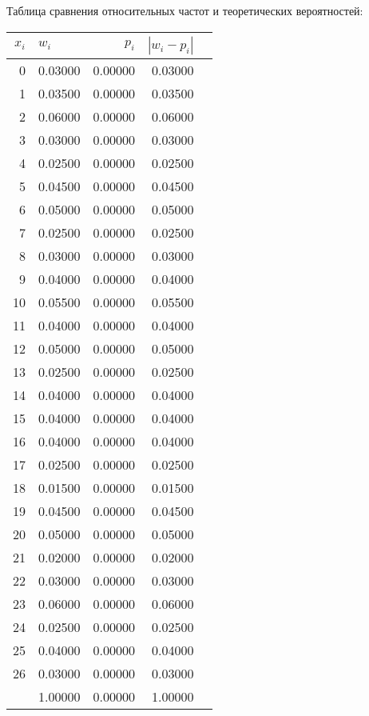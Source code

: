 
\newline

\newline
Таблица сравнения относительных частот и теоретических вероятностей:\newline
\begin{center}
\begin{tabular}{| r | l | r | r | r |}
\hline
$x_i$ & $w_i$ & $p_i$ & $|w_i-p_i|$ \\\hline
0 & 0.03000 & 0.00000 & 0.03000 \\\hline
1 & 0.03500 & 0.00000 & 0.03500 \\\hline
2 & 0.06000 & 0.00000 & 0.06000 \\\hline
3 & 0.03000 & 0.00000 & 0.03000 \\\hline
4 & 0.02500 & 0.00000 & 0.02500 \\\hline
5 & 0.04500 & 0.00000 & 0.04500 \\\hline
6 & 0.05000 & 0.00000 & 0.05000 \\\hline
7 & 0.02500 & 0.00000 & 0.02500 \\\hline
8 & 0.03000 & 0.00000 & 0.03000 \\\hline
9 & 0.04000 & 0.00000 & 0.04000 \\\hline
10 & 0.05500 & 0.00000 & 0.05500 \\\hline
11 & 0.04000 & 0.00000 & 0.04000 \\\hline
12 & 0.05000 & 0.00000 & 0.05000 \\\hline
13 & 0.02500 & 0.00000 & 0.02500 \\\hline
14 & 0.04000 & 0.00000 & 0.04000 \\\hline
15 & 0.04000 & 0.00000 & 0.04000 \\\hline
16 & 0.04000 & 0.00000 & 0.04000 \\\hline
17 & 0.02500 & 0.00000 & 0.02500 \\\hline
18 & 0.01500 & 0.00000 & 0.01500 \\\hline
19 & 0.04500 & 0.00000 & 0.04500 \\\hline
20 & 0.05000 & 0.00000 & 0.05000 \\\hline
21 & 0.02000 & 0.00000 & 0.02000 \\\hline
22 & 0.03000 & 0.00000 & 0.03000 \\\hline
23 & 0.06000 & 0.00000 & 0.06000 \\\hline
24 & 0.02500 & 0.00000 & 0.02500 \\\hline
25 & 0.04000 & 0.00000 & 0.04000 \\\hline
26 & 0.03000 & 0.00000 & 0.03000 \\\hline
  & 1.00000 & 0.00000 & 1.00000 \\\hline
\end{tabular}
\end{center}
